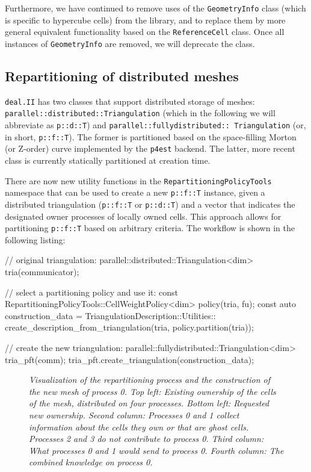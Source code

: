 \documentclass{ansarticle-preprint}
\newcommand{\specialword}[1]{\texttt{#1}}
\newcommand{\dealii}{{\specialword{deal.II}}\xspace}
\begin{document}
Furthermore, we have continued to remove uses of the
\texttt{GeometryInfo} class (which is specific to hypercube cells) from
the library, and to replace them by more general equivalent
functionality based on the
\texttt{ReferenceCell} class. Once all instances of
\texttt{GeometryInfo} are removed, we will deprecate the class.

\subsection{Repartitioning of distributed meshes}\label{sec:repartitioning}

\dealii{} has two classes that support distributed storage of meshes: 
\texttt{parallel::\allowbreak distributed::\allowbreak Triangulation}
(which in the following we will abbreviate as \texttt{p::d::T}) and
\texttt{parallel::\allowbreak fully\allowbreak distributed::\allowbreak
  Triangulation} (or, in short, \texttt{p::f::T}). The former is
partitioned based on the space-filling Morton (or Z-order) curve
implemented by the \texttt{p4est} backend. The latter, more recent
class is currently statically partitioned at creation time.

There are now new utility functions in the
\texttt{RepartitioningPolicyTools} namespace that can be
used to create a new \texttt{p::f::T} instance,
given a distributed triangulation (\texttt{p::f::T} or
\texttt{p::d::T}) and a vector that indicates the designated owner processes of locally
owned cells. This approach allows for partitioning \texttt{p::f::T}
based on arbitrary criteria. The workflow is shown in the following listing:
\begin{c++}
// original triangulation:
parallel::distributed::Triangulation<dim> tria(communicator);

// select a partitioning policy and use it:
const RepartitioningPolicyTools::CellWeightPolicy<dim> policy(tria, fu);
const auto construction_data = TriangulationDescription::Utilities::
  create_description_from_triangulation(tria, policy.partition(tria));

// create the new triangulation:
parallel::fullydistributed::Triangulation<dim> tria_pft(comm);
tria_pft.create_triangulation(construction_data);
\end{c++}

\begin{figure}
    \centering
    \def\svgwidth{0.8\columnwidth}
    
    \caption{\it Visualization of the repartitioning process and the
      construction of the new mesh of process 0. Top
      left: Existing ownership of the cells of the mesh, distributed
      on four processes. Bottom left:
      Requested new ownership. Second column: Processes 0 and 1
      collect information about the cells they own or that are ghost
      cells. Processes 2 and 3 do not contribute to process 0. Third column: What
      processes 0 and 1 would send to process 0. Fourth column: The
      combined knowledge on process 0.}\label{fig:repartitioning}
\end{figure}
\end{document}
